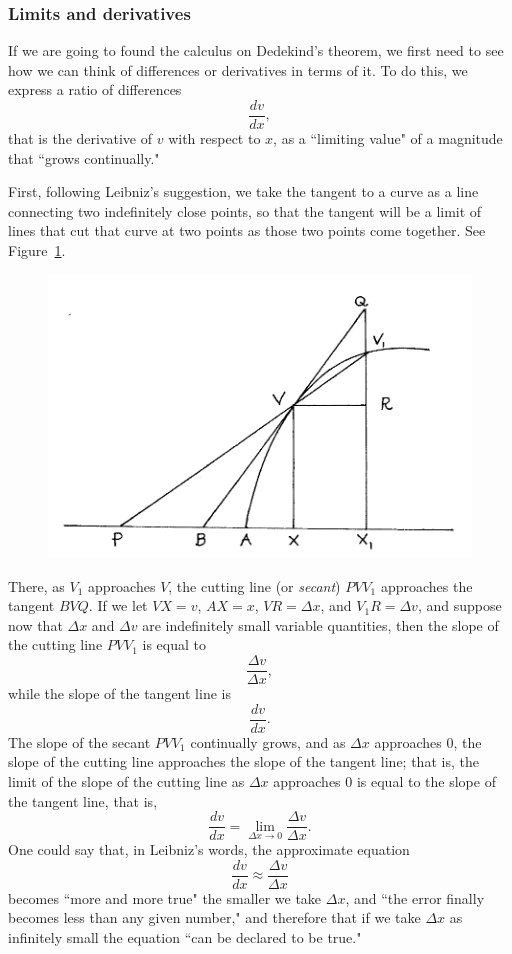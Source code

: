 \documentclass[twoside,openright]{article}
\begin{document}
\subsubsection*{Limits and derivatives}

If we are going to found the calculus on Dedekind's theorem, we first
need to see how we can think of differences or derivatives in terms of
it.  To do this, we express a ratio of differences
$$\frac{dv}{dx},$$
that is the derivative of $v$ with respect to $x$, as a ``limiting
value" of a magnitude that ``grows continually."

First, following Leibniz's suggestion, we take the tangent to a curve
as a line connecting two indefinitely close points, so that the
tangent will be a limit of lines that cut that curve at two points as
those two points come together.  See Figure~\ref{limitfig}.
\begin{figure}[htp]
  \begin{center}
    \includegraphics[width=.65\textwidth]{fig/Figure79}
    \caption{}
    \label{limitfig}
    \vspace{-10pt}
  \end{center}
\end{figure} There, as $V_1$ approaches $V$, the cutting line (or {\em
  secant}) $PVV_1$ approaches the tangent $BVQ$.  If we let $VX=v$,
$AX=x$, $VR =\Delta x$, and $V_1R = \Delta v$, and suppose now that
$\Delta x$ and $\Delta v$ are indefinitely small variable quantities,
then the slope of the cutting line $PVV_1$ is equal to
$$ \frac{\Delta v}{\Delta x},$$
while the slope of the tangent line is 
$$\frac{dv}{dx}.$$
The slope of the secant $PVV_1$ continually grows, and as $\Delta x$
approaches 0, the slope of the cutting line approaches the slope of
the tangent line; that is, the limit of the slope of the cutting line
as $\Delta x$ approaches 0 is equal to the slope of the tangent line,
that is,
$$\frac{dv}{dx} = \lim_{\Delta x \rightarrow 0}\frac{\Delta v}{\Delta x}.$$
One could say that, in Leibniz's words, the approximate equation
$$\frac{dv}{dx} \approx \frac{\Delta v}{\Delta x}$$
becomes ``more and more true" the smaller we take $\Delta x$, and
``the error finally becomes less than any given number," and therefore
that if we take $\Delta x$ as infinitely small the equation ``can be
declared to be true."
\end{document}
